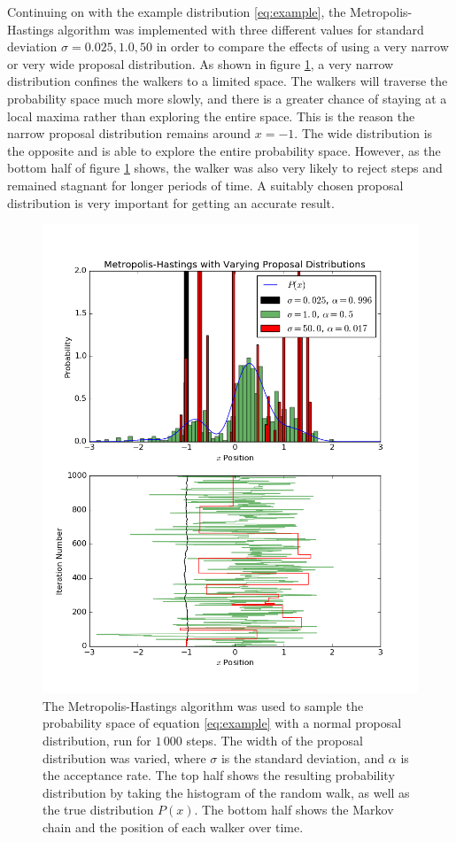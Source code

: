 \documentclass[twocolumn]{article}
\begin{document}
Continuing on with the example distribution \ref{eq:example}, the
Metropolis-Hastings algorithm was implemented with three different values for
standard deviation $\sigma = 0.025, 1.0, 50$ in order to compare the effects of
using a very narrow or very wide proposal distribution. As shown in figure
\ref{fig:mcmc1}, a very narrow distribution confines the walkers to a limited
space. The walkers will traverse the probability space much more slowly, and
there is a greater chance of staying at a local maxima rather than exploring the
entire space. This is the reason the narrow proposal distribution remains around
$x = -1$. The wide distribution is the opposite and is able to explore the
entire probability space. However, as the bottom half of figure \ref{fig:mcmc1}
shows, the walker was also very likely to reject steps and remained stagnant for
longer periods of time. A suitably chosen proposal distribution is very
important for getting an accurate result.

\begin{figure}[p]
	\centering
	\includegraphics[width=\linewidth]{mcmc1.png}
	\caption{
		The Metropolis-Hastings algorithm was used to sample the probability space
		of equation \ref{eq:example} with a normal proposal distribution, run for
		$1\,000$ steps. The width of the proposal distribution was varied, where
		$\sigma$ is the standard deviation, and $\alpha$ is the acceptance rate. The
		top half shows the resulting probability distribution by taking the
		histogram of the random walk, as well as the true distribution $P(x)$. The
		bottom half shows the Markov chain and the position of each walker over
		time.
	}
	\label{fig:mcmc1}
\end{figure}
\end{document}
